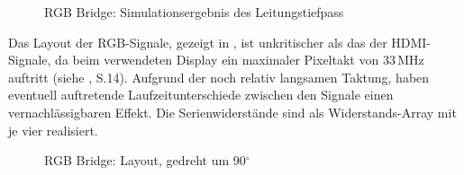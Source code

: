 \begin{figure}[htbp]
 			\caption{RGB Bridge: Simulationsergebnis des Leitungstiefpass}
            \label{fig:teilb_tiefpass_mess}
\end{figure}
Das Layout der RGB-Signale, gezeigt in , ist unkritischer als das der HDMI-Signale, da beim verwendeten Display ein maximaler Pixeltakt von 33\,MHz auftritt (siehe \cite{LG2012}, S.14). Aufgrund der noch relativ langsamen Taktung, haben eventuell auftretende Laufzeitunterschiede zwischen den Signale einen vernachlässigbaren Effekt. Die Serienwiderstände sind als Widerstands-Array mit je vier realisiert.
\begin{figure}[htp]
	\center
 	\caption{RGB Bridge: Layout, gedreht um 90$^{\circ}$} 
    \label{fig:teilb_rgb_bridge_pcb}
\end{figure}
\newpage
